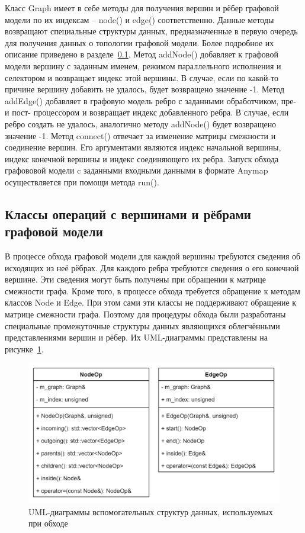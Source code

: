 Класс \textsf{Graph} имеет в себе методы для получения вершин и рёбер графовой модели по их индексам -- \textsf{node()} и \textsf{edge()} соответственно. Данные методы возвращают специальные структуры данных, предназначенные в первую очередь для получения данных о топологии графовой модели. Более подробное их описание приведено в разделе~\ref{sec:operation_classes}. Метод \textsf{addNode()} добавляет к графовой модели вершину с заданным именем, режимом параллельного исполнения и селектором и возвращает индекс этой вершины. В случае, если по какой-то причине вершину добавить не удалось, будет возвращено значение -1. Метод \textsf{addEdge()} добавляет в графовую модель ребро с заданными обработчиком, пре- и пост- процессором и возвращает индекс добавленного ребра. В случае, если ребро создать не удалось, аналогично методу \textsf{addNode()} будет возвращено значение -1. Метод \textsf{connect()} отвечает за изменение матрицы смежности и соединение вершин. Его аргументами являются индекс начальной вершины, индекс конечной вершины и индекс соединяющего их ребра. Запуск обхода графововой модели c заданными входными данными в формате \textsf{Anymap} осуществляется при помощи метода \textsf{run()}.

\subsection{Классы операций с вершинами и рёбрами графовой модели}\label{sec:operation_classes}
В процессе обхода графовой модели для каждой вершины требуются сведения об исходящих из неё рёбрах. Для каждого ребра требуются сведения о его конечной вершине. Эти сведения могут быть получены при обращении к матрице смежности графа. Кроме того, в процессе обхода требуется обращение к методам классов \textsf{Node} и \textsf{Edge}. При этом сами эти классы не поддерживают обращение к матрице смежности графа. Поэтому для процедуры обхода были разработаны специальные промежуточные структуры данных являющихся облегчёнными представлениями вершин и рёбер. Их UML-диаграммы представлены на рисунке~\ref{fig:UMLOperations}.

\begin{figure}[!ht]
    \centering
    \includegraphics[height=0.3\textheight]{figures/UML.topologyOperations.png}
    \caption{UML-диаграммы вспомогательных структур данных, используемых при обходе}
    \label{fig:UMLOperations}
\end{figure}

